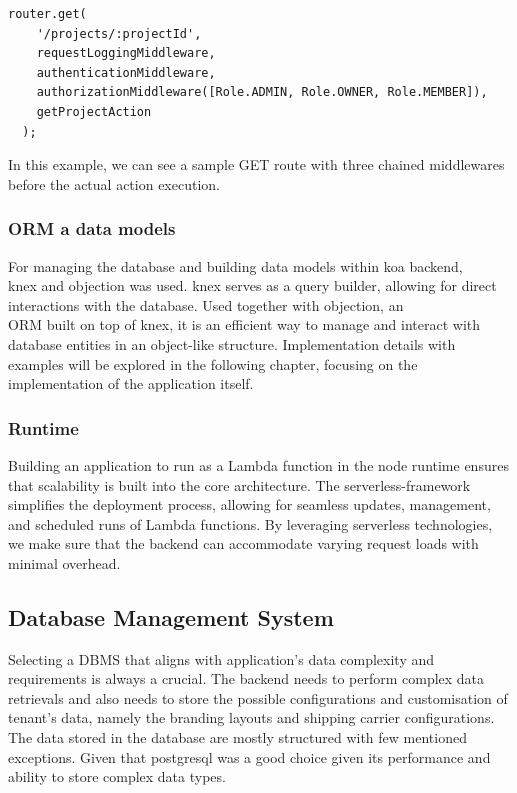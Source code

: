 \medskip
\begin{lstlisting}[caption=Koa router example]
  router.get(
    '/projects/:projectId',
    requestLoggingMiddleware,
    authenticationMiddleware,
    authorizationMiddleware([Role.ADMIN, Role.OWNER, Role.MEMBER]),
    getProjectAction
  );
\end{lstlisting}

In this example, we can see a sample GET route with three chained middlewares before the actual action execution.


\subsubsection{ORM a data models}
For managing the database and building data models within \gls{koa} backend,\\ \gls{knex} and \gls{objection} was used.
\gls{knex} serves as a query builder, allowing for direct interactions with the database.
Used together with \gls{objection}, an \\ \ac{ORM} built on top of \gls{knex}, it is an efficient way to manage and interact with database entities in an object-like structure.
Implementation details with examples will be explored in the following chapter, focusing on the implementation of the application itself.


\subsubsection{Runtime}
Building an application to run as a Lambda function in the \gls{node} runtime ensures that scalability is built into the core architecture.
The \gls{serverless-framework} simplifies the deployment process, allowing for seamless updates, management, and scheduled runs of Lambda functions.
By leveraging serverless technologies, we make sure that the backend can accommodate varying request loads with minimal overhead.


\subsection{Database Management System}
\label{subsec:dbms}
Selecting a \ac{DBMS} that aligns with application's data complexity and requirements is always a crucial. 
The backend needs to perform complex data retrievals and also needs to store the possible configurations and customisation of tenant's data, namely the branding layouts and shipping carrier configurations.
The data stored in the database are mostly structured with few mentioned exceptions.
Given that \gls{postgresql} was a good choice given its performance and ability to store complex data types.

